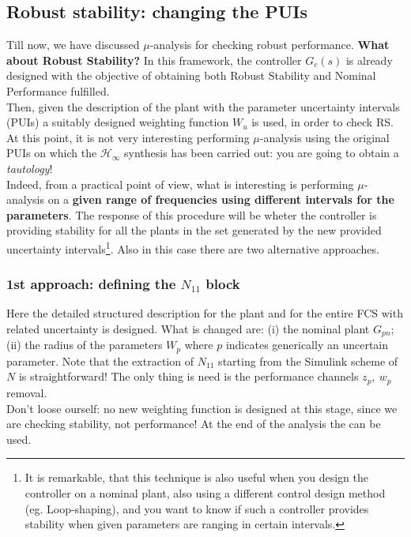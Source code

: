 \documentclass[a4paper, 12pt]{article}
\begin{document}
\subsection{Robust stability: changing the PUIs}
Till now, we have discussed $\mu$-analysis for checking robust performance. \textbf{What about Robust Stability?}
In this framework, the controller $G_c(s)$ is already designed with the objective of obtaining both Robust Stability and Nominal Performance fulfilled. \\
Then, given the description of the plant with the parameter uncertainty intervals (PUIs) a suitably designed weighting function $W_u$ is used, in order to check RS. At this point, it is not very interesting performing $\mu$-analysis using the original PUIs on which the $\mathcal{H}_\infty$ synthesis has been carried out: you are going to obtain a \textit{tautology}!\\

\noindent
Indeed, from a practical point of view, what is interesting is performing $\mu$-analysis on a \textbf{given range of frequencies using different intervals for the parameters}. The response of this procedure will be wheter the controller  is providing stability   for all the plants in the set generated by the new provided uncertainty intervals\footnote{
    It is remarkable, that this technique is also useful when you design the controller on a nominal plant, also using a different control design method (eg. Loop-shaping), and you want to know if such a controller provides stability when given parameters are ranging in certain intervals.
}. Also in this case there are two alternative approaches. 

\subsubsection{1st approach: defining the $N_{11}$ block}
Here the detailed structured description for the plant and for the entire FCS with related uncertainty is designed. What is changed are: (i) the nominal plant $G_{pn}$; (ii) the radius of the  parameters $W_{p}$ where $p$ indicates generically an uncertain parameter. Note that the extraction of $N_{11}$ starting from the Simulink scheme of $N$ is straightforward! The only thing is need is the performance channels $z_p,\ w_p$ removal. \\
Don't loose ourself: no new weighting function is designed at this stage, since we are checking stability, not performance! At the end of the analysis the  can be used.
\end{document}
